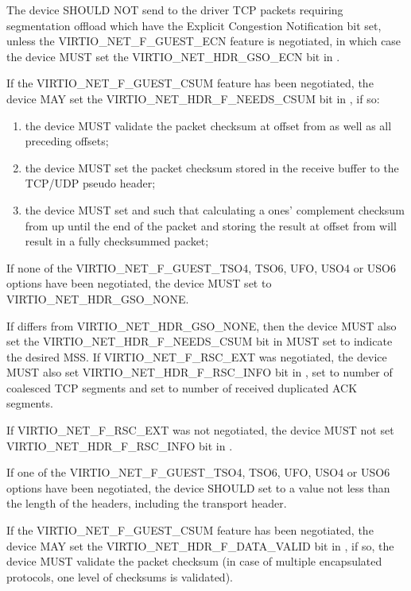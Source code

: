 The device SHOULD NOT send to the driver TCP packets requiring segmentation offload
which have the Explicit Congestion Notification bit set, unless the
VIRTIO_NET_F_GUEST_ECN feature is negotiated, in which case the
device MUST set the VIRTIO_NET_HDR_GSO_ECN bit in
.

If the VIRTIO_NET_F_GUEST_CSUM feature has been negotiated, the
device MAY set the VIRTIO_NET_HDR_F_NEEDS_CSUM bit in
, if so:
\begin{enumerate}
\item the device MUST validate the packet checksum at
	offset  from  as well as all
	preceding offsets;
\item the device MUST set the packet checksum stored in the
	receive buffer to the TCP/UDP pseudo header;
\item the device MUST set  and
	 such that calculating a ones'
	complement checksum from  up until the
	end of the packet and storing the result at offset
	 from   will result in a
	fully checksummed packet;
\end{enumerate}

If none of the VIRTIO_NET_F_GUEST_TSO4, TSO6, UFO, USO4 or USO6 options have
been negotiated, the device MUST set  to
VIRTIO_NET_HDR_GSO_NONE.

If  differs from VIRTIO_NET_HDR_GSO_NONE, then
the device MUST also set the VIRTIO_NET_HDR_F_NEEDS_CSUM bit in
 MUST set  to indicate the desired MSS.
If VIRTIO_NET_F_RSC_EXT was negotiated, the device MUST also
set VIRTIO_NET_HDR_F_RSC_INFO bit in ,
set  to number of coalesced TCP segments and
set  to number of received duplicated ACK segments.

If VIRTIO_NET_F_RSC_EXT was not negotiated, the device MUST
not set VIRTIO_NET_HDR_F_RSC_INFO bit in .

If one of the VIRTIO_NET_F_GUEST_TSO4, TSO6, UFO, USO4 or USO6 options have
been negotiated, the device SHOULD set  to a value
not less than the length of the headers, including the transport
header.

If the VIRTIO_NET_F_GUEST_CSUM feature has been negotiated, the
device MAY set the VIRTIO_NET_HDR_F_DATA_VALID bit in
, if so, the device MUST validate the packet
checksum (in case of multiple encapsulated protocols, one level
of checksums is validated).

